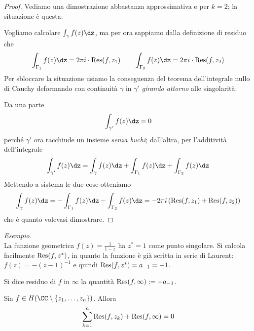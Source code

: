 \begin{proof} 
Vediamo una dimostrazione abbastanza approssimativa e per $k=2$; la situazione è questa:


Vogliamo calcolare $\int_{\gamma}f(z)\dz$, ma per ora sappiamo dalla definizione di residuo che
$$\int_{\Gamma_1}f(z)\dz=2\pi i\cdot \Res(f,z_1) \qquad \int_{\Gamma_2}f(z)\dz=2\pi i\cdot \Res(f,z_2)$$
Per sbloccare la situazione usiamo la conseguenza del teorema dell'integrale nullo di Cauchy deformando con continuità $\gamma$ in $\gamma'$ \textit{girando attorno} alle singolarità:


Da una parte 
$$\int_{\gamma'}f(z)\dz=0$$
perché $\gamma'$ ora racchiude un insieme \textit{senza buchi}; dall'altra, per l'additività dell'integrale 
$$
\int_{\gamma'}f(z)\dz=\int_\gamma f(z)\dz+\int_{\Gamma_1}f(z)\dz+\int_{\Gamma_2}f(z)\dz
$$
Mettendo a sistema le due cose otteniamo
\begin{equation*}
\int_\gamma f(z)\dz=-\int_{\Gamma_1}f(z)\dz-\int_{\Gamma_2}f(z)\dz=-2\pi i\left(\Res(f,z_1)+\Res(f,z_2)\right)
\end{equation*}
che è quanto volevasi dimostrare.
\end{proof}

\textit{Esempio.}\\
La funzione geometrica $f(z)=\frac{1}{1-z}$ ha $z^*=1$ come punto singolare. Si calcola facilmente $\operatorname{Res}(f,z^*)$, in quanto la funzione è già scritta in serie di Laurent: $f(z)=-(z-1)^{-1}$ e quindi $\operatorname{Res}(f,z^*)=a_{-1}=-1$.

\begin{defn}
Si dice residuo di $f$ in $\infty$ la quantità $\operatorname{Res}(f,\infty):=-a_{-1}$.
\end{defn}

\begin{thm}
Sia $f\in H(\CC\setminus\{z_1,\dotsc,z_n\})$. Allora
\begin{equation*}
\sum\limits^{n}_{k = 1}\operatorname{Res} (f, z_{k}) + \operatorname{Res} (f, \infty) = 0
\end{equation*}
\end{thm}

